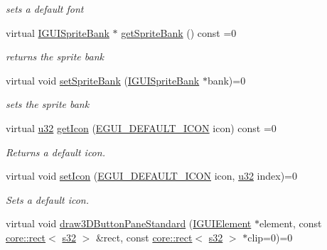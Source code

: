 \begin{DoxyCompactItemize}
\begin{DoxyCompactList}\small\item\em sets a default font \end{DoxyCompactList}\item 
\mbox{\label{classirr_1_1gui_1_1IGUISkin_a24d886480acfd238f6965adfc8a2a7d6}} 
virtual \hyperlink{classirr_1_1gui_1_1IGUISpriteBank}{I\+G\+U\+I\+Sprite\+Bank} $\ast$ \hyperlink{classirr_1_1gui_1_1IGUISkin_a24d886480acfd238f6965adfc8a2a7d6}{get\+Sprite\+Bank} () const =0
\begin{DoxyCompactList}\small\item\em returns the sprite bank \end{DoxyCompactList}\item 
\mbox{\label{classirr_1_1gui_1_1IGUISkin_a65c467725a7b2cd2bf772b5ae2efac44}} 
virtual void \hyperlink{classirr_1_1gui_1_1IGUISkin_a65c467725a7b2cd2bf772b5ae2efac44}{set\+Sprite\+Bank} (\hyperlink{classirr_1_1gui_1_1IGUISpriteBank}{I\+G\+U\+I\+Sprite\+Bank} $\ast$bank)=0
\begin{DoxyCompactList}\small\item\em sets the sprite bank \end{DoxyCompactList}\item 
virtual \hyperlink{namespaceirr_a0416a53257075833e7002efd0a18e804}{u32} \hyperlink{classirr_1_1gui_1_1IGUISkin_a1b96a5dcaa7ffb9228fc2095be6b18c5}{get\+Icon} (\hyperlink{namespaceirr_1_1gui_a8e54aa253459daf0b62670bda4556d9f}{E\+G\+U\+I\+\_\+\+D\+E\+F\+A\+U\+L\+T\+\_\+\+I\+C\+ON} icon) const =0
\begin{DoxyCompactList}\small\item\em Returns a default icon. \end{DoxyCompactList}\item 
virtual void \hyperlink{classirr_1_1gui_1_1IGUISkin_a7994f1001681b5eabf398b5c4c24c304}{set\+Icon} (\hyperlink{namespaceirr_1_1gui_a8e54aa253459daf0b62670bda4556d9f}{E\+G\+U\+I\+\_\+\+D\+E\+F\+A\+U\+L\+T\+\_\+\+I\+C\+ON} icon, \hyperlink{namespaceirr_a0416a53257075833e7002efd0a18e804}{u32} index)=0
\begin{DoxyCompactList}\small\item\em Sets a default icon. \end{DoxyCompactList}\item 
virtual void \hyperlink{classirr_1_1gui_1_1IGUISkin_a71becc9ffab32e4b2709bed573097d4b}{draw3\+D\+Button\+Pane\+Standard} (\hyperlink{classirr_1_1gui_1_1IGUIElement}{I\+G\+U\+I\+Element} $\ast$element, const \hyperlink{classirr_1_1core_1_1rect}{core\+::rect}$<$ \hyperlink{namespaceirr_ac66849b7a6ed16e30ebede579f9b47c6}{s32} $>$ \&rect, const \hyperlink{classirr_1_1core_1_1rect}{core\+::rect}$<$ \hyperlink{namespaceirr_ac66849b7a6ed16e30ebede579f9b47c6}{s32} $>$ $\ast$clip=0)=0

\end{DoxyCompactItemize}
